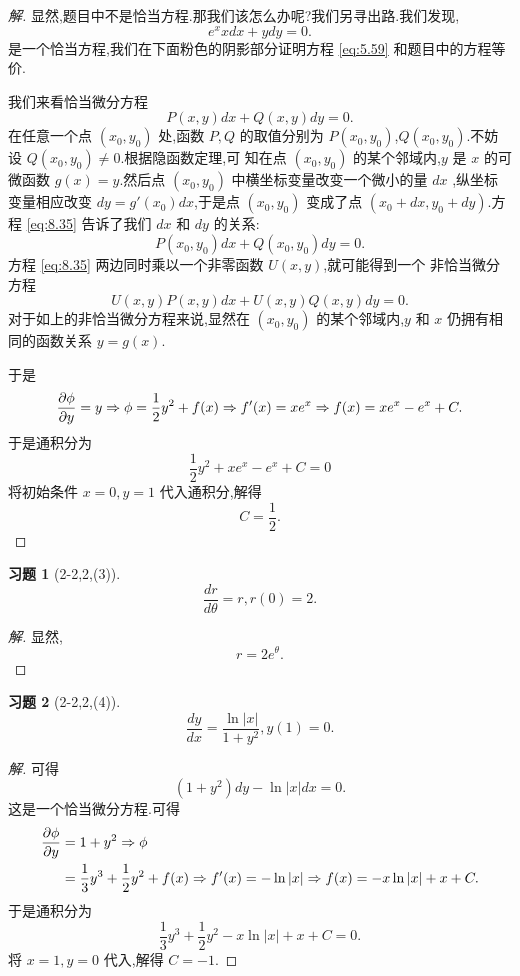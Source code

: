 \documentclass[a4paper, 11pt]{article} %
\newtheorem*{cdtheorem}{习题}
\newenvironment{exercise}
{\begin{mdframed}[backgroundcolor=gray!40,rightline=false,leftline=false,topline=false,bottomline=false]\begin{cdtheorem}}
    {\end{cdtheorem}\end{mdframed}}
\begin{document}
\begin{proof}[解]
显然,题目中不是恰当方程.那我们该怎么办呢?我们另寻出路.我们发现,
\begin{equation}\label{eq:5.59}
e^xxdx+ydy=0.
\end{equation}
是一个恰当方程,我们在下面粉色的阴影部分证明方程 \eqref{eq:5.59} 和题目中的方程等价.
\begin{shaded}
我们来看恰当微分方程
\begin{equation}
  \label{eq:8.35}
P(x,y)dx+Q(x,y)dy=0.  
\end{equation}
在任意一个点 $(x_0,y_0)$ 处,函数 $P,Q$ 的取值分别为
$P(x_0,y_0)$,$Q(x_0,y_0)$.不妨设 $Q(x_0,y_0)\neq 0$.根据隐函数定理,可
知在点 $(x_0,y_0)$ 的某个邻域内,$y$ 是 $x$ 的可微函数 $g(x)=y$.然后点
$(x_0,y_0)$ 中横坐标变量改变一个微小的量 $dx$ ,纵坐标变量相应改变 $dy=g'(x_0)dx$,于是点 $(x_0,y_0)$ 变成了点
$(x_0+dx,y_0+dy)$.方程 \eqref{eq:8.35} 告诉了我们 $d
x$ 和 $d y$ 的关系:
\begin{equation}
  \label{eq:9.07}
  P(x_0,y_0)dx+Q(x_0,y_0)dy=0.
\end{equation}
方程 \eqref{eq:8.35} 两边同时乘以一个非零函数 $U(x,y)$,就可能得到一个
非恰当微分方程
\begin{equation}
  \label{eq:3.17pm}
  U(x,y)P(x,y)dx+U(x,y)Q(x,y)dy=0.
\end{equation}
对于如上的非恰当微分方程来说,显然在 $(x_0,y_0)$ 的某个邻域内,$y$ 和 $x$ 仍拥有相同的函数关系 $y=g(x)$.
\end{shaded}
于是$$
\frac{\partial\phi}{\partial y}=y\Rightarrow \phi=\frac{1}{2}y^2+f(x)\Rightarrow f'(x)=xe^x\Rightarrow f(x)=xe^x-e^x+C.
$$
于是通积分为
$$
\frac{1}{2}y^2+xe^x-e^x+C=0
$$
将初始条件 $x=0,y=1$ 代入通积分,解得
$$
C=\frac{1}{2}.
$$
\end{proof}
\begin{exercise}[2-2,2,(3)]
$$
\frac{dr}{d\theta}=r,r(0)=2.
$$
\end{exercise}
\begin{proof}[解]
显然,
$$
r=2e^{\theta}.
$$
\end{proof}
\begin{exercise}[2-2,2,(4)]
$$
\frac{dy}{dx}=\frac{\ln |x|}{1+y^2},y(1)=0.
$$  
\end{exercise}
\begin{proof}[解]
可得
$$
(1+y^2)dy-\ln |x|dx=0.
$$
这是一个恰当微分方程.可得
\begin{align*}
\frac{\partial\phi}{\partial y}&=1+y^2\Rightarrow
\phi\\&=\frac{1}{3}y^3+\frac{1}{2}y^2+f(x)\Rightarrow f'(x)=-\ln |x|\Rightarrow f(x)=-x\ln |x|+x+C.
\end{align*}
于是通积分为
$$
\frac{1}{3}y^3+\frac{1}{2}y^2-x\ln |x|+x+C=0.
$$
将 $x=1,y=0$ 代入,解得 $C=-1$.
\end{proof}
\end{document}
